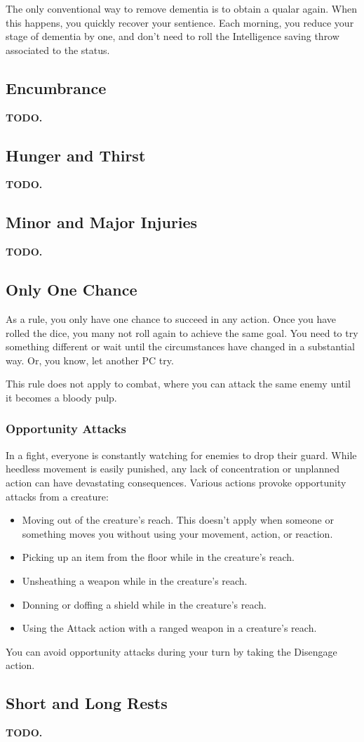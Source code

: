     The only conventional way to remove dementia is to obtain a qualar again.
    When this happens, you quickly recover your sentience.
    Each morning, you reduce your stage of dementia by one, and don't need to roll the Intelligence saving throw associated to the status.

\subsection*{Encumbrance} \label{ssec::encumbrance}
    \textbf{TODO.}

\subsection*{Hunger and Thirst} \label{ssec::hungerandthirst}
    \textbf{TODO.}

\subsection*{Minor and Major Injuries} \label{ssec::minorandmajorinjuries}
    \textbf{TODO.}

\subsection*{Only One Chance} \label{ssec::onlyonechance}
    As a rule, you only have one chance to succeed in any action.
    Once you have rolled the dice, you many not roll again to achieve the same goal.
    You need to try something different or wait until the circumstances have changed in a substantial way.
    Or, you know, let another PC try.

    This rule does not apply to combat, where you can attack the same enemy until it becomes a bloody pulp.

\subsubsection*{Opportunity Attacks} \label{rule::opportunityattacks}
    In a fight, everyone is constantly watching for enemies to drop their guard.
    While heedless movement is easily punished, any lack of concentration or unplanned action can have devastating consequences.
    Various actions provoke opportunity attacks from a creature:
    \begin{itemize}
        \item Moving out of the creature's reach.
        This doesn't apply when someone or something moves you without using your movement, action, or reaction.
        \item Picking up an item from the floor while in the creature's reach.
        \item Unsheathing a weapon while in the creature's reach.
        \item Donning or doffing a shield while in the creature's reach.
        \item Using the Attack action with a ranged weapon in a creature's reach.
    \end{itemize}
    You can avoid opportunity attacks during your turn by taking the Disengage action.

\subsection*{Short and Long Rests} \label{ssec::shortandlongrests}
    \textbf{TODO.}
